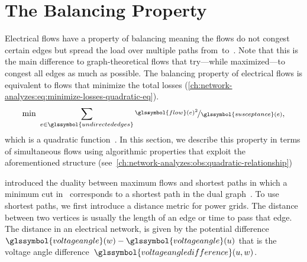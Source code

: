 \section{The Balancing Property}
\label{ch:network-analyzes:sec:balancing-property}
% 
Electrical flows have a property of balancing meaning the flows do not congest
certain edges but spread the load over multiple paths from~\source to~\sink.
Note that this is the main difference to graph-theoretical flows that
try---while maximized---to congest all edges as much as possible. The balancing
property of electrical flows is equivalent to flows that minimize the total
losses (\cref{ch:network-analyzes:eq:minimize-losses-quadratic-eq}).
% 
\begin{equation}
    \min~\sum_{\edge\in\glssymbol{undirectededges}}
    \nicefrac{\glssymbol{flow}(\edge)^2}{\glssymbol{susceptance}(\edge)},
    \label{ch:network-analyzes:eq:minimize-losses-quadratic-eq}
\end{equation}
% 
which is a quadratic function~\parencite[p.275; Section~2.2, Energy
Equation]{Chr11}. In this section, we describe this property in terms of
simultaneous flows using algorithmic properties that exploit the aforementioned
structure (see~\cref{ch:network-analyzes:obs:quadratic-relationship})

\textcite[p.404; Section~3]{For56} introduced the duality between maximum flows
and shortest paths in which a minimum cut in~ corresponds to a
shortest path in the dual graph~. To use shortest paths, we
first introduce a distance metric for power grids. The distance between two
vertices is usually the length of an edge or time to pass that edge. The
distance in an electrical network, is given by the potential
difference~$
    \glssymbol{voltageangle}(\vertexc) 
    -
    \glssymbol{voltageangle}(\vertexa)
$ that is the voltage angle difference~$
    \glssymbol{voltageangledifference}(\vertexa,\vertexc)
$.
 
